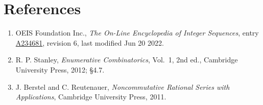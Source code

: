 \documentclass[11pt]{article}
\theoremstyle{definition}
\begin{document}
\section{References}

\begin{enumerate}

\item OEIS Foundation Inc., \emph{The On-Line Encyclopedia of Integer Sequences}, entry \href{https://oeis.org/A234681}{A234681}, revision 6, last modified Jun 20 2022.

\item R. P. Stanley, \emph{Enumerative Combinatorics}, Vol.~1, 2nd ed., Cambridge University Press, 2012; \S4.7.

\item J. Berstel and C. Reutenauer, \emph{Noncommutative Rational Series with Applications}, Cambridge University Press, 2011.

\end{enumerate}
\end{document}
